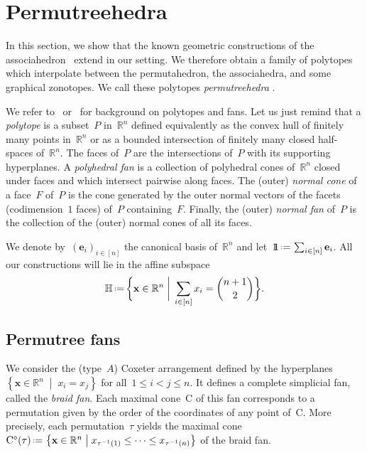 \documentclass[ALCO]{cedram}
\newcommand{\R}{\mathbb{R}} %
\newcommand{\HH}{\mathbb{H}} %
\renewcommand{\b}[1]{\mathbf{#1}} %
\newcommand{\set}[2]{\left\{ #1 \;\middle|\; #2 \right\}} %
\newcommand{\biggset}[2]{\bigg\{ #1 \;\bigg|\; #2 \bigg\}} %
\newcommand{\one}{{1\!\!1}} %
\newcommand{\eqdef}{\mbox{\,\raisebox{0.2ex}{\scriptsize\ensuremath{\mathrm:}}\ensuremath{=}\,}} %
\newcommand{\polar}{^\diamond} %
\newcommand{\Cone}{\mathrm{C}} %
\newcommand{\darkblue}{\color{darkblue}} %
\newcommand{\defn}[1]{\emph{\darkblue #1}} %
\begin{document}

\section{Permutreehedra}
\label{sec:permutreehedra}

In this section, we show that the known geometric constructions of the associahedron~\cite{Loday, HohlwegLange, LangePilaud} extend in our setting. We therefore obtain a family of polytopes which interpolate between the permutahedron, the associahedra, and some graphical zonotopes. We call these polytopes \defn{permutreehedra} .

We refer to~\cite{Ziegler} or~\cite[Chapter~5]{Matousek} for background on polytopes and fans. Let us just remind that a \defn{polytope} is a subset~$P$ in~$\R^n$ defined equivalently as the convex hull of finitely many points in~$\R^n$ or as a bounded intersection of finitely many closed half-spaces of~$\R^n$. The faces of~$P$ are the intersections of~$P$ with its supporting hyperplanes. A \defn{polyhedral fan} is a collection of polyhedral cones of~$\R^n$ closed under faces and which intersect pairwise along faces. The (outer) \defn{normal cone} of a face~$F$ of~$P$ is the cone generated by the outer normal vectors of the facets (codimension~$1$ faces) of~$P$ containing~$F$. Finally, the (outer) \defn{normal fan} of~$P$ is the collection of the (outer) normal cones of all its faces.

We denote by~$(\b{e}_i)_{i \in [n]}$ the canonical basis of~$\R^n$ and let~$\one \eqdef \sum_{i \in [n]} \b{e}_i$. All our constructions will lie in the affine subspace
\[
\HH \eqdef \biggset{\b{x} \in \R^n}{\sum_{i \in [n]} x_i = \binom{n+1}{2}}.
\]


\subsection{Permutree fans}
\label{subsec:permutreeFans}

We consider the (type~$A$) Coxeter arrangement defined by the hyperplanes~$\set{\b{x} \in \R^n}{x_i = x_j}$ for all~$1 \le i < j \le n$. It defines a complete simplicial fan, called the \defn{braid fan}. Each maximal cone~$\Cone$ of this fan corresponds to a permutation given by the order of the coordinates of any point of~$\Cone$. More precisely, each permutation~$\tau$ yields the maximal cone~$\Cone\polar(\tau) \eqdef \set{\b{x} \in \R^n}{x_{\tau^{-1}(1)} \le \dots \le x_{\tau^{-1}(n)}}$ of the braid fan.
\end{document}
